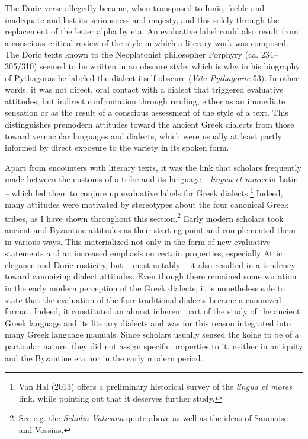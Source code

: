 \documentclass[12pt]{article}
\newenvironment{styleStandard}{\renewcommand\baselinestretch{1.25}\setlength\leftskip{0in}\setlength\rightskip{0in}\setlength\parindent{0.1972in}\setlength\parfillskip{0pt plus 1fil}\setlength\parskip{0in plus 1pt}\writerlistparindent\writerlistleftskip\leavevmode\normalfont\normalsize\writerlistlabel\ignorespaces}{\unskip\vspace{0in plus 1pt}\par}
\newcommand\writerlistleftskip{}
\newcommand\writerlistparindent{}
\newcommand\writerlistlabel{}
\begin{document}
\begin{styleStandard}
The Doric verse allegedly became, when transposed to Ionic, feeble and inadequate and lost its seriousness and majesty, and this solely through the replacement of the letter alpha by eta. An evaluative label could also result from a conscious critical review of the style in which a literary work was composed. The Doric texts known to the Neoplatonist philosopher Porphyry (ca. 234–305/310) seemed to be written in an obscure style, which is why in his biography of Pythagoras he labeled the dialect itself obscure (\textit{Vita Pythagorae} 53). In other words, it was not direct, oral contact with a dialect that triggered evaluative attitudes, but indirect confrontation through reading, either as an immediate sensation or as the result of a conscious assessment of the style of a text. This distinguishes premodern attitudes toward the ancient Greek dialects from those toward vernacular languages and dialects, which were usually at least partly informed by direct exposure to the variety in its spoken form.
\end{styleStandard}

\begin{styleStandard}
Apart from encounters with literary texts, it was the link that scholars frequently made between the customs of a tribe and its language – \textit{lingua et mores }in Latin – which led them to conjure up evaluative labels for Greek dialects.\footnote{ Van Hal (2013) offers a preliminary historical survey of the \textit{lingua et mores} link, while pointing out that it deserves further study.} Indeed, many attitudes were motivated by stereotypes about the four canonical Greek tribes, as I have shown throughout this section.\footnote{ See e.g. the \textit{Scholia Vaticana} quote above as well as the ideas of Saumaise and Vossius.} Early modern scholars took ancient and Byzantine attitudes as their starting point and complemented them in various ways. This materialized not only in the form of new evaluative statements and an increased emphasis on certain properties, especially Attic elegance and Doric rusticity, but – most notably – it also resulted in a tendency toward canonizing dialect attitudes. Even though there remained some variation in the early modern perception of the Greek dialects, it is nonetheless safe to state that the evaluation of the four traditional dialects became a canonized format. Indeed, it constituted an almost inherent part of the study of the ancient Greek language and its literary dialects and was for this reason integrated into many Greek language manuals. Since scholars usually sensed the koine to be of a particular nature, they did not assign specific properties to it, neither in antiquity and the Byzantine era nor in the early modern period.
\end{styleStandard}
\end{document}
